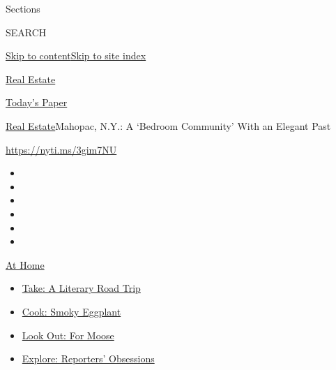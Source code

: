 Sections

SEARCH

\protect\hyperlink{site-content}{Skip to
content}\protect\hyperlink{site-index}{Skip to site index}

\href{https://www.nytimes.com/section/realestate}{Real Estate}

\href{https://myaccount.nytimes.com/auth/login?response_type=cookie\&client_id=vi}{}

\href{https://www.nytimes.com/section/todayspaper}{Today's Paper}

\href{/section/realestate}{Real Estate}\textbar{}Mahopac, N.Y.: A
`Bedroom Community' With an Elegant Past

\url{https://nyti.ms/3gim7NU}

\begin{itemize}
\item
\item
\item
\item
\item
\item
\end{itemize}

\href{https://www.nytimes.com/spotlight/at-home?action=click\&pgtype=Article\&state=default\&region=TOP_BANNER\&context=at_home_menu}{At
Home}

\begin{itemize}
\tightlist
\item
  \href{https://www.nytimes.com/2020/07/28/books/time-for-a-literary-road-trip.html?action=click\&pgtype=Article\&state=default\&region=TOP_BANNER\&context=at_home_menu}{Take:
  A Literary Road Trip}
\item
  \href{https://www.nytimes.com/2020/07/29/magazine/bored-with-your-home-cooking-some-smoky-eggplant-will-fix-that.html?action=click\&pgtype=Article\&state=default\&region=TOP_BANNER\&context=at_home_menu}{Cook:
  Smoky Eggplant}
\item
  \href{https://www.nytimes.com/2020/07/27/travel/moose-michigan-isle-royale.html?action=click\&pgtype=Article\&state=default\&region=TOP_BANNER\&context=at_home_menu}{Look
  Out: For Moose}
\item
  \href{https://www.nytimes.com/interactive/2020/at-home/even-more-reporters-editors-diaries-lists-recommendations.html?action=click\&pgtype=Article\&state=default\&region=TOP_BANNER\&context=at_home_menu}{Explore:
  Reporters' Obsessions}
\end{itemize}

